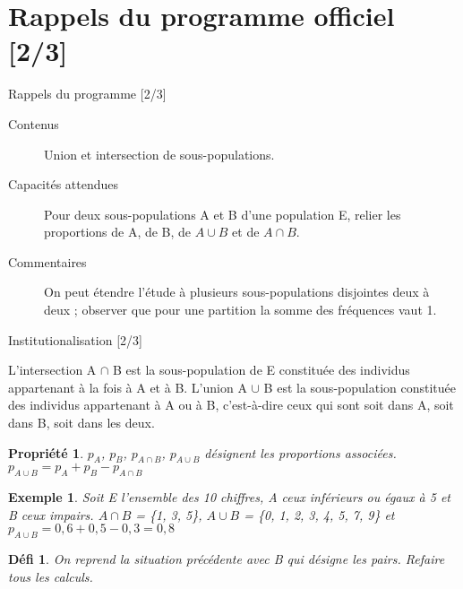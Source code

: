 \documentclass[presentation]{beamer}
\newtheorem{property}{Propriété}[section]
\newtheorem{defi}{Défi}[section]
\newtheorem{exe}{Exemple}[section]
\begin{document}
\section{Rappels du programme officiel [2/3]}
\label{sec:orgfc644c3}
\begin{frame}[label={sec:org47faa7c}]{Rappels du programme [2/3]}
\begin{description}
\item[{Contenus}] Union et intersection de sous-populations.
\item[{Capacités attendues}] Pour deux sous-populations A et B d'une
population E, relier les proportions de A, de B, de \(A \cup B\)
et de \(A \cap B\).
\item[{Commentaires}] On peut étendre l'étude à plusieurs
sous-populations disjointes deux à deux ;
observer que pour une partition la somme des
fréquences vaut 1.
\end{description}
\end{frame}

\begin{frame}[label={sec:org61a02e0}]{Institutionalisation [2/3]}
\begin{definition}
L'\alert{intersection A \(\cap\) B} est la sous-population de E constituée
des individus appartenant à la fois \alert{à A et à B}. L'\alert{union A \(\cup\)
B} est la sous-population constituée des individus appartenant \alert{à A
ou à B}, c'est-à-dire ceux qui sont soit dans A, soit dans B, soit
dans les deux. 
\end{definition}

\begin{property}
\(p_A\), \(p_B\), \(p_{A\cap B}\), \(p_{A\cup B}\) désignent les
proportions associées. \(p_{A\cup B} = p_A + p_B - p_{A\cap B}\)
\end{property}

\begin{exe}
Soit E l'ensemble des 10 chiffres, A ceux inférieurs ou égaux à 5
et B ceux impairs. \(A\cap B\) = \{1, 3, 5\}, \(A\cup B\) = \{0, 1, 2,
3, 4, 5, 7, 9\} et \(p_{A\cup B} = 0,6 + 0,5 - 0,3 = 0,8\)
\end{exe}

\begin{defi}
On reprend la situation précédente avec B qui désigne les
pairs. Refaire tous les calculs.
\end{defi}
\end{frame}
\end{document}
